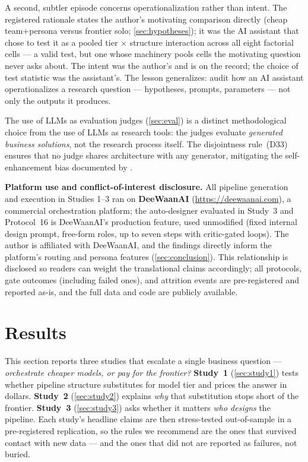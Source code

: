 \documentclass[12pt,a4paper]{article}
\begin{document}
A second, subtler episode concerns operationalization rather than intent. The
registered rationale states the author's motivating comparison directly (cheap
team+persona versus frontier solo; \cref{sec:hypotheses}); it was the AI
assistant that chose to test it as a pooled tier $\times$ structure
interaction across all eight factorial cells --- a valid test, but one whose
machinery pools cells the motivating question never asks about. The intent
was the author's and is on the record; the choice of test statistic was the
assistant's. The lesson generalizes: audit how an AI assistant
operationalizes a research question --- hypotheses, prompts, parameters ---
not only the outputs it produces.

The use of LLMs as evaluation judges (\cref{sec:eval}) is a distinct
methodological choice from the use of LLMs as research tools: the judges
evaluate \emph{generated business solutions}, not the research process itself.
The disjointness rule~(D33) ensures that no judge shares architecture with any
generator, mitigating the self-enhancement bias documented by
\citet{ZhengEtAl2023}.

\textbf{Platform use and conflict-of-interest disclosure.} All pipeline
generation and execution in Studies 1--3 ran on \textbf{DeeWaanAI}
(\url{https://deewaanai.com}), a commercial orchestration platform; the
auto-designer evaluated in Study~3 and Protocol~16 is DeeWaanAI's production
feature, used unmodified (fixed internal design prompt, free-form roles,
up to seven steps with critic-gated loops). The author is affiliated with
DeeWaanAI, and the findings directly inform the platform's routing and
persona features (\cref{sec:conclusion}). This relationship is disclosed so
readers can weight the translational claims accordingly; all protocols,
gate outcomes (including failed ones), and attrition events are
pre-registered and reported as-is, and the full data and code are publicly
available.

\section{Results}\label{sec:results}

This section reports three studies that escalate a single business question ---
\emph{orchestrate cheaper models, or pay for the frontier?} \textbf{Study~1}
(\cref{sec:study1}) tests whether pipeline structure substitutes for model tier
and prices the answer in dollars. \textbf{Study~2} (\cref{sec:study2}) explains
\emph{why} that substitution stops short of the frontier. \textbf{Study~3}
(\cref{sec:study3}) asks whether it matters \emph{who designs} the pipeline.
Each study's headline claims are then stress-tested out-of-sample in a
pre-registered replication, so the rules we recommend are the ones that survived
contact with new data --- and the ones that did not are reported as failures,
not buried.
\end{document}
